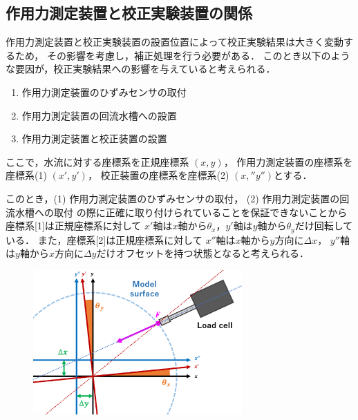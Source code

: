 \documentclass[twocolumn,a4j]{jsarticle}
\begin{document}
\subsection{作用力測定装置と校正実験装置の関係}
作用力測定装置と校正実験装置の設置位置によって校正実験結果は大きく変動するため，
その影響を考慮し，補正処理を行う必要がある．
このとき以下のような要因が，校正実験結果への影響を与えていると考えられる．

\begin{enumerate}[(1)]
    \item 作用力測定装置のひずみセンサの取付
    \item 作用力測定装置の回流水槽への設置
    \item 作用力測定装置と校正装置の設置
\end{enumerate}

\newpage

ここで，水流に対する座標系を正規座標系 $(x,y)$，
作用力測定装置の座標系を座標系(1) $(x',y')$，
校正装置の座標系を座標系(2) $(x,'' y'')$とする．

このとき，(1) 作用力測定装置のひずみセンサの取付，
(2) 作用力測定装置の回流水槽への取付 の際に正確に取り付けられていることを保証できないことから
座標系[1]は正規座標系に対して
$x'$軸は$x$軸から$\theta_x$，$y'$軸は$y$軸から$\theta_y$だけ回転している．
また，座標系[2]は正規座標系に対して
$x''$軸は$x$軸から$y$方向に$\Delta x$，
$y''$軸は$y$軸から$x$方向に$\Delta y$だけオフセットを持つ状態となると考えられる．

\begin{figure}[htbp]
    \footnotesize
    \begin{center}
        \includegraphics[width=80mm]{../images/31-1.png}
        \caption{}
    \end{center}
\end{figure}
\end{document}
